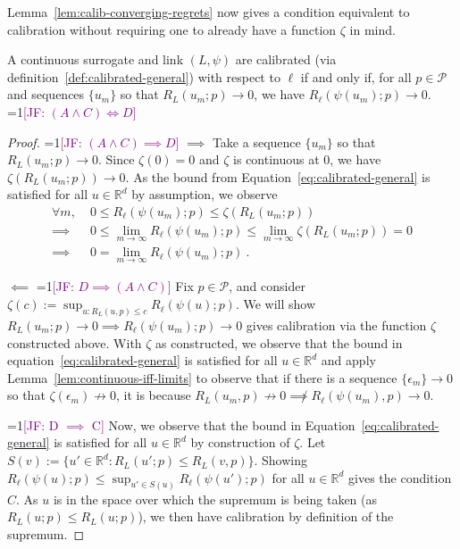 \documentclass[anon,12pt]{colt2021} %
\newcommand{\Comments}{1}
\newcommand{\mynote}[2]{\ifnum\Comments=1\textcolor{#1}{#2}\fi}
\newcommand{\jessie}[1]{\mynote{purple}{[JF: #1]}}
\newcommand{\reals}{\mathbb{R}}
\renewcommand{\P}{\mathcal{P}}
\begin{document}
Lemma~\ref{lem:calib-converging-regrets} now gives a condition equivalent to calibration without requiring one to already have a function $\zeta$ in mind.
\begin{lemma}\label{lem:calib-converging-regrets}
	A continuous surrogate and link $(L,\psi)$ are calibrated (via definition~\ref{def:calibrated-general}) with respect to $\ell$ if and only if, for all $p \in \P$ and sequences $\{u_m\}$ so that $R_L(u_m; p) \to 0$, we have $R_\ell(\psi(u_m); p) \to 0$.
	\jessie{$(A \wedge C) \iff D$}
\end{lemma}
\begin{proof}
\jessie{$(A \wedge C) \implies D$}
	$\implies$ Take a sequence $\{u_m\}$ so that $R_L(u_m;p) \to 0$.
	Since $\zeta(0) = 0$ and $\zeta$ is continuous at $0$, we have $\zeta(R_L(u_m;p)) \to 0$.
	As the bound from Equation~\eqref{eq:calibrated-general} is satisfied for all $u \in \reals^d$ by assumption, we observe
	\begin{align*}
	\forall m, \; &0 \leq R_\ell(\psi(u_m); p) \leq \zeta(R_L(u_m;p))\\
	\implies &0 \leq \lim_{m \to \infty} R_\ell(\psi(u_m); p) \leq \lim_{m \to \infty} \zeta(R_L(u_m;p)) = 0\\
	\implies &0 = \lim_{m\to\infty} R_\ell(\psi(u_m); p) ~.~
	\end{align*}
	
	
	$\impliedby$ 
\jessie{$D \implies (A \wedge C)$}
	Fix $p \in \P$, and consider $\zeta(c) := \sup_{u: R_L(u,p) \leq c} R_\ell(\psi(u); p)$.  
	We will show $R_L(u_m; p) \to 0 \implies R_\ell(\psi(u_m); p) \to 0$ gives calibration via the function $\zeta$ constructed above. 
	With $\zeta$ as constructed, we observe that the bound in equation~\eqref{eq:calibrated-general} is satisfied for all $u \in \reals^d$ and apply Lemma~\ref{lem:continuous-iff-limits} to observe that if there is a sequence $\{\epsilon_m\} \to 0$ so that $\zeta(\epsilon_m) \not \to 0$, it is because $R_L(u_m, p) \not \to 0 \not\implies R_\ell(\psi(u_m), p) \to 0$.
	

\jessie{D $\implies$ C}
Now, we observe that the bound in Equation~\eqref{eq:calibrated-general} is satisfied for all $u \in \reals^d$ by construction of $\zeta$.
Let $S(v) := \{u' \in \reals^d : R_L(u';p) \leq R_L(v,p) \}$.
Showing $R_\ell(\psi(u);p) \leq \sup_{u' \in S(u)} R_\ell(\psi(u') ; p)$ for all $u \in \reals^d$ gives the condition $C$.
As $u$ is in the space over which the supremum is being taken (as $R_L(u;p) \leq R_L(u;p)$), we then have calibration by definition of the supremum.


\end{proof}
\end{document}

